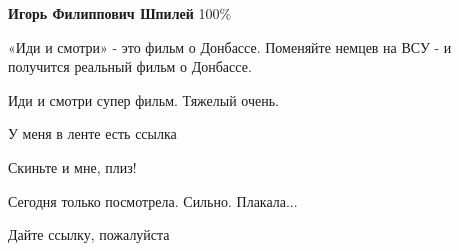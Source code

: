 \begin{itemize}
\begin{itemize}
\textbf{Игорь Филиппович Шпилей} 100\%
\end{itemize}

 
«Иди и смотри» - это фильм о Донбассе. Поменяйте немцев на ВСУ - и получится реальный фильм о Донбассе.

 
Иди и смотри супер фильм. Тяжелый очень.

 
У меня в ленте есть ссылка

 
Скиньте и мне, плиз!

 
Сегодня только посмотрела. Сильно. Плакала...

 
Дайте ссылку, пожалуйста


\end{itemize}

